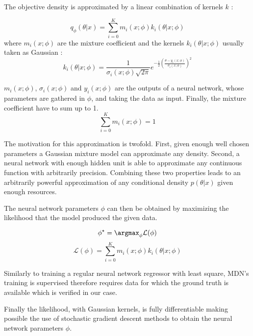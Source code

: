 The objective density is approximated by a linear combination of kernels $k$ :

\begin{equation}
    q_\phi(\theta | x) = \sum_{i=0}^K m_i(x ; \phi) k_i(\theta | x ; \phi)
\end{equation}
where $m_i(x ; \phi)$ are the mixture coefficient
and the kernels $k_i(\theta | x ; \phi)$ usually taken as Gaussian :
\begin{equation}
    k_i(\theta | x ; \phi) = \frac{1}{\sigma_i(x ; \phi) \sqrt{2 \pi}} e^{- \frac{1}{2} \left ( \frac{\theta-y_i(x ; \phi)}{\sigma_i(x ; \phi)} \right )^2} 
\end{equation}

$m_i(x ; \phi)$, $\sigma_i(x ; \phi)$ and $y_i(x ; \phi)$ are the outputs of a neural network, whose parameters are gathered in $\phi$, and taking the data as input.
Finally, the mixture coefficient have to sum up to 1.
\begin{equation}
    \sum_{i=0}^K m_i(x ; \phi) =  1
\end{equation}

The motivation for this approximation is twofold.
First, given enough well chosen parameters a Gaussian mixture model can approximate any density.
Second, a neural network with enough hidden unit is able to approximate any continuous function with arbitrarily precision.
Combining these two properties leads to an arbitrarily powerful approximation of any conditional density $p(\theta|x)$ given enough resources.

The neural network parameters $\phi$ can then be obtained by maximizing the likelihood that the model produced the given data.

\begin{equation}
    \phi^\star = \argmax_\phi \mathcal L (\phi)
\end{equation}
\begin{equation}
    \mathcal L (\phi) = \sum_{i=0}^K m_i(x ; \phi) k_i(\theta | x ; \phi)
\end{equation}

Similarly to training a regular neural network regressor with least square, MDN's training is supervised therefore requires data for which the ground truth is available which is verified in our case.

Finally the likelihood, with Gaussian kernels, is fully differentiable making possible the use of stochastic gradient descent methods to obtain the neural network parameters $\phi$.

